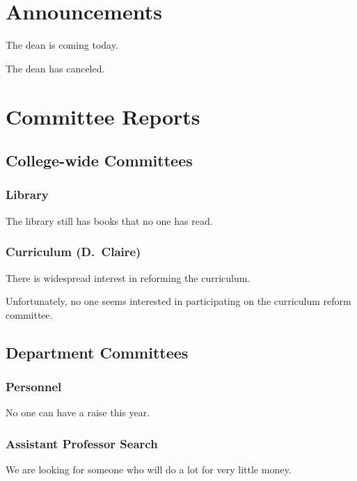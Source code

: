 \documentclass[11pt]{meetingmins}
\begin{document}
\maketitle

\section{Announcements}
\begin{hiddenitems}
\item
The dean is coming today.

\item
The dean has canceled.

\end{hiddenitems}

\section{Committee Reports}

\subsection{College-wide Committees}
\subsubsection{Library}
The library still has books that no one has read.

\subsubsection{Curriculum {\rm (D.~Claire)}}
\begin{hiddensubitems}
\item
There is widespread interest in reforming the curriculum.

\item
Unfortunately, no one seems interested in participating on the
curriculum reform committee.
\end{hiddensubitems}

\subsection{Department Committees}
\subsubsection{Personnel}
No one can have a raise this year.

\subsubsection{Assistant Professor Search}
We are looking for someone who will do a lot for very little money.
\end{document}
